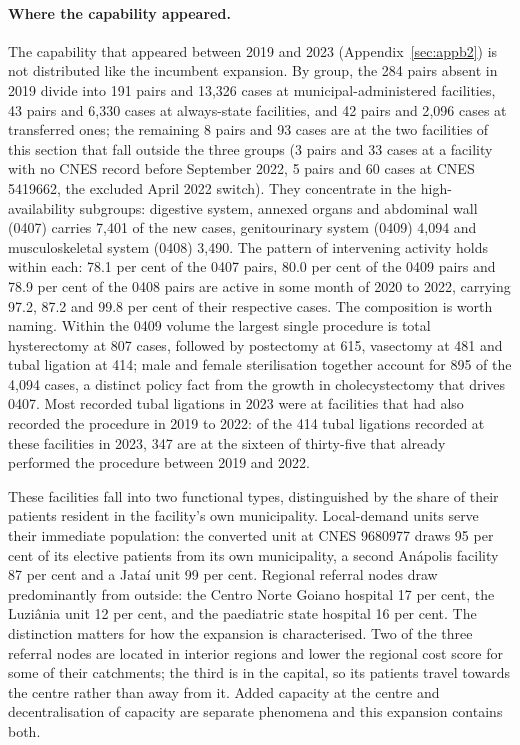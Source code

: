 \paragraph{Where the capability appeared.} The capability that appeared between 2019 and 2023 (Appendix~\ref{sec:appb2}) is not distributed like the incumbent expansion. By group, the 284 pairs absent in 2019
divide into 191 pairs and 13{,}326 cases at
municipal-administered facilities, 43 pairs and 6{,}330 cases at always-state
facilities, and 42 pairs and 2{,}096 cases at transferred ones; the remaining 8 pairs
and 93 cases are at the two facilities of this section that fall outside the three groups
(3 pairs and 33 cases at a facility with no CNES record before September 2022, 5 pairs and 60 cases at CNES 5419662, the excluded April 2022 switch). They concentrate
in the high-availability subgroups: digestive system, annexed organs and abdominal wall (0407) carries 7{,}401 of
the new cases, genitourinary system (0409) 4{,}094 and musculoskeletal system
(0408) 3{,}490. The pattern of intervening activity holds within each: 78.1 per cent of the
0407 pairs, 80.0 per cent of the 0409 pairs and 78.9 per cent of the 0408 pairs
are active in some month of 2020 to 2022, carrying 97.2, 87.2 and 99.8 per cent
of their respective cases. The composition is worth naming. Within the 0409
volume the largest single procedure is total hysterectomy at 807 cases, followed
by postectomy at 615, vasectomy at 481 and tubal ligation at 414; male and female
sterilisation together account for 895 of the 4{,}094 cases, a distinct policy
fact from the growth in cholecystectomy that drives 0407. Most recorded tubal ligations in 2023 were at facilities that had also recorded the procedure in 2019 to 2022: of the 414 tubal ligations recorded at these facilities in 2023, 347 are at the sixteen of thirty-five that already performed the procedure between 2019 and 2022.

These facilities fall into two functional types, distinguished by the share of their
patients resident in the facility's own municipality. Local-demand units serve
their immediate population: the converted unit at CNES 9680977 draws 95 per cent
of its elective patients from its own municipality, a second An\'apolis facility
87 per cent and a Jata\'i unit 99 per cent. Regional referral nodes draw
predominantly from outside: the Centro Norte Goiano hospital 17 per cent, the
Luzi\^ania unit 12 per cent, and the paediatric state hospital 16 per cent. The
distinction matters for how the expansion is characterised. Two of the three
referral nodes are located in interior regions and lower the regional cost score for some of their catchments; the third is in the capital, so its patients travel
towards the centre rather than away from it. Added capacity at the centre and
decentralisation of capacity are separate phenomena and this expansion contains
both.


